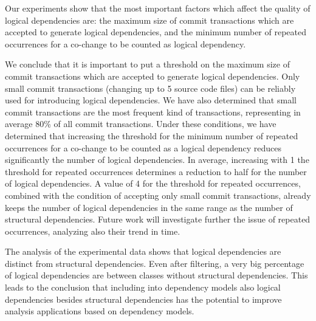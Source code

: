 \documentclass[a4paper,twoside]{article}
\begin{document}
Our experiments show that the most important factors which affect the quality of logical dependencies are: the maximum size of commit transactions which are accepted to generate logical dependencies, and the minimum number of repeated occurrences for a co-change to be counted as logical dependency. 

We conclude that it is important to put a threshold on the maximum size of commit transactions which are accepted to generate logical dependencies. Only small commit transactions (changing up to 5 source code files) can be reliably used for introducing logical dependencies. We have also determined that small commit transactions are the most frequent kind of transactions, representing in average 80\% of all commit transactions. Under these conditions, we have determined that increasing the threshold for the minimum number of repeated occurrences for a co-change to be counted as a logical dependency reduces significantly the number of logical dependencies. In average, increasing with 1 the threshold for repeated occurrences determines a reduction to half for the number of logical dependencies.  A value of 4 for the threshold for repeated occurrences, combined with the condition of accepting only small commit transactions, already keeps the number of logical dependencies in the same range as the number of structural dependencies. Future work will investigate further the issue of repeated occurrences, analyzing also their trend in time. 

The analysis of the experimental data shows that logical dependencies are distinct from structural dependencies. Even after filtering, a very big percentage of logical dependencies are between classes without structural dependencies. This leads to the conclusion that including into dependency models also logical dependencies besides structural dependencies has the potential to improve analysis applications based on dependency models.

 


 

{\small
}
 
\end{document}
